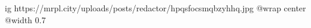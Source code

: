  
 
 
 
 

\ifcmt
  ig https://mrpl.city/uploads/posts/redactor/hpqsfocsmqbzyhhq.jpg
  @wrap center
  @width 0.7
\fi
